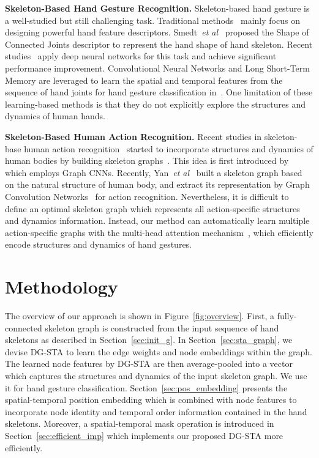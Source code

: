 \documentclass{bmvc2k}
\def\etal{\emph{et al}\bmvaOneDot}
\begin{document}
\textbf{Skeleton-Based Hand Gesture Recognition.} Skeleton-based hand gesture is a well-studied but still challenging task. Traditional methods~\cite{ohn2013joint,de2016skeleton,de2017shrec,lu2003using} mainly focus on designing powerful hand feature descriptors. Smedt~\etal~\cite{de2016skeleton} proposed the Shape of Connected Joints descriptor to represent the hand shape of hand skeleton. Recent studies~\cite{hou2018spatial,chen2017motion,nunez2018convolutional} apply deep neural networks for this task and achieve significant performance improvement. Convolutional Neural Networks and Long Short-Term Memory are leveraged to learn the spatial and temporal features from the sequence of hand joints for hand gesture classification in~\cite{nunez2018convolutional}. One limitation of these learning-based methods is that they do not explicitly explore the structures and dynamics of human hands.

\textbf{Skeleton-Based Human Action Recognition.} Recent studies in skeleton-base human action recognition~\cite{zhao2018learning,tang2018quantized,peng2018jointly} started to incorporate structures and dynamics of human bodies by building skeleton graphs~\cite{yan2018spatial,si2018skeleton,zhao2019semantic}. This idea is first introduced by~\cite{dlid2017graph} which employs Graph CNNs. Recently, Yan~\etal~\cite{yan2018spatial} built a skeleton graph based on the natural structure of human body, and extract its representation by Graph Convolution Networks~\cite{kipf2016semi} for action recognition. Nevertheless, it is difficult to define an optimal skeleton graph which represents all action-specific structures and dynamics information. Instead, our method can automatically learn multiple action-specific graphs with the multi-head attention mechanism~\cite{vaswani2017attention}, which efficiently encode structures and dynamics of hand gestures.

%
 \section{Methodology}

The overview of our approach is shown in Figure~\ref{fig:overview}. First, a fully-connected skeleton graph is constructed from the input sequence of hand skeletons as described in Section~\ref{sec:init_g}. In Section~\ref{sec:sta_graph}, we devise DG-STA to learn the edge weights and node embeddings within the graph. The learned node features by DG-STA are then average-pooled into a vector which captures the structures and dynamics of the input skeleton graph. We use it for hand gesture classification.
Section~\ref{sec:pos_embedding} presents the spatial-temporal position embedding which is combined with node features to incorporate node identity and temporal order information contained in the hand skeletons. Moreover, a spatial-temporal mask operation is introduced in Section~\ref{sec:efficient_imp} which implements our proposed DG-STA more efficiently.     
\end{document}
